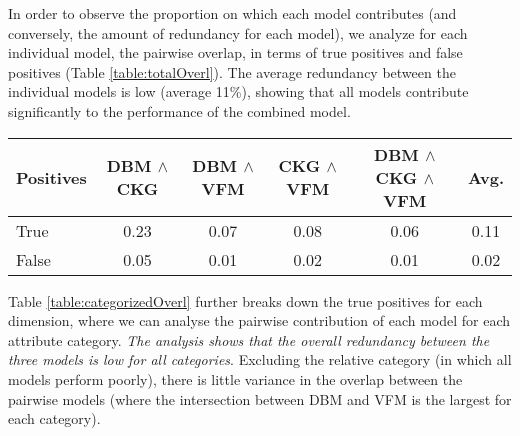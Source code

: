 \documentclass[11pt,a4paper]{article}
\begin{document}
In order to observe the proportion on which each model contributes (and conversely, the amount of redundancy for each model), we analyze for each individual model, the pairwise overlap, in terms of true positives and false positives (Table \ref{table:totalOverl}). The average redundancy between the individual models is low (average 11\%), showing that all models contribute significantly to the performance of the combined model. 

\begin{table*}[!htb]
    \centering
    \begin{center}
        \begin{tabularx}{\textwidth}{|X|c|c|c|c|c|}
            \hline
            \textbf{Positives} & \textbf{DBM} $\land$ \textbf{CKG} & \textbf{DBM} $\land$ \textbf{VFM} & \textbf{CKG} $\land$ \textbf{VFM} & \textbf{DBM} $\land$ \textbf{CKG} $\land$ \textbf{VFM} & \textbf{Avg.}\\
            \hline
            True & 0.23 & 0.07 & 0.08 & 0.06  & 0.11 \\
            False & 0.05 & 0.01 & 0.02 & 0.01  & 0.02 \\
            \hline
        \end{tabularx}
    \end{center}
    \caption{Overlap between the components relative to the combined model.}
    \label{table:totalOverl}
\end{table*}

Table \ref{table:categorizedOverl} further breaks down the true positives for each dimension, where we can analyse the pairwise contribution of each model for each attribute category. \textit{The analysis shows that the overall redundancy between the three models is low for all categories}. Excluding the relative category (in which all models perform poorly), there is little variance in the overlap between the pairwise models (where the intersection between DBM and VFM is the largest for each category). 
\end{document}
